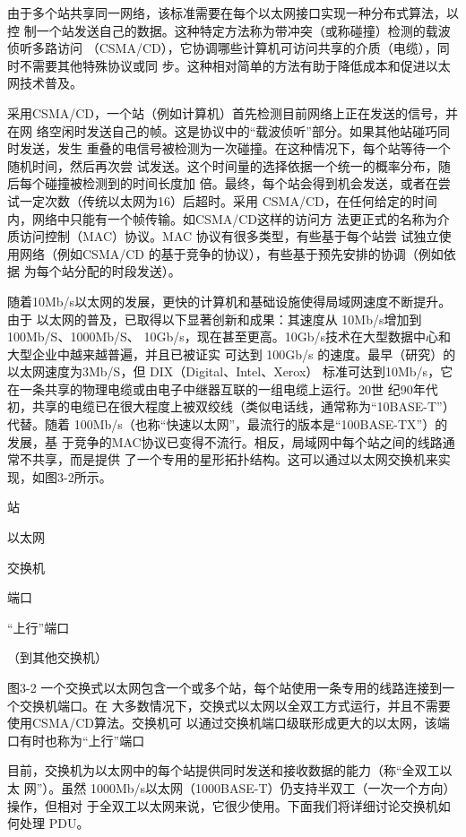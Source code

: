 由于多个站共享同一网络，该标准需要在每个以太网接口实现一种分布式算法，以控
制一个站发送自己的数据。这种特定方法称为带冲突（或称碰撞）检测的载波侦听多路访问
（CSMA/CD），它协调哪些计算机可访问共享的介质（电缆），同时不需要其他特殊协议或同
步。这种相对简单的方法有助于降低成本和促进以太网技术普及。

采用CSMA/CD，一个站（例如计算机）首先检测目前网络上正在发送的信号，并在网
络空闲时发送自己的帧。这是协议中的“载波侦听”部分。如果其他站碰巧同时发送，发生
重叠的电信号被检测为一次碰撞。在这种情况下，每个站等待一个随机时间，然后再次尝
试发送。这个时间量的选择依据一个统一的概率分布，随后每个碰撞被检测到的时间长度加
倍。最终，每个站会得到机会发送，或者在尝试一定次数（传统以太网为16）后超时。采用
CSMA/CD，在任何给定的时间内，网络中只能有一个帧传输。如CSMA/CD这样的访问方
法更正式的名称为介质访问控制（MAC）协议。MAC 协议有很多类型，有些基于每个站尝
试独立使用网络（例如CSMA/CD 的基于竞争的协议），有些基于预先安排的协调（例如依据
为每个站分配的时段发送）。

随着10Mb/s以太网的发展，更快的计算机和基础设施使得局域网速度不断提升。由于
以太网的普及，已取得以下显著创新和成果：其速度从 10Mb/s增加到 100Mb/S、1000Mb/S、
10Gb/s，现在甚至更高。10Gb/s技术在大型数据中心和大型企业中越来越普遍，并且已被证实
可达到 100Gb/s 的速度。最早（研究）的以太网速度为3Mb/S，但 DIX（Digital、Intel、Xerox）
标准可达到10Mb/s，它在一条共享的物理电缆或由电子中继器互联的一组电缆上运行。20世
纪90年代初，共享的电缆已在很大程度上被双绞线（类似电话线，通常称为“10BASE-T”）
代替。随着 100Mb/s（也称“快速以太网”，最流行的版本是“100BASE-TX”）的发展，基
于竞争的MAC协议已变得不流行。相反，局域网中每个站之间的线路通常不共享，而是提供
了一个专用的星形拓扑结构。这可以通过以太网交换机来实现，如图3-2所示。

站

以太网

交换机

端口

“上行”端口

（到其他交换机）

图3-2 一个交换式以太网包含一个或多个站，每个站使用一条专用的线路连接到一个交换机端口。在
大多数情况下，交换式以太网以全双工方式运行，并且不需要使用CSMA/CD算法。交换机可
以通过交换机端口级联形成更大的以太网，该端口有时也称为“上行”端口

目前，交换机为以太网中的每个站提供同时发送和接收数据的能力（称“全双工以太
网”）。虽然 1000Mb/s以太网（1000BASE-T）仍支持半双工（一次一个方向）操作，但相对
于全双工以太网来说，它很少使用。下面我们将详细讨论交换机如何处理 PDU。

